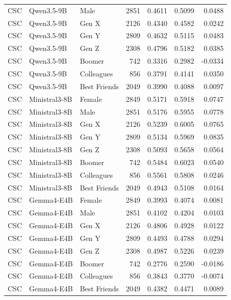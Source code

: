 \begin{longtable}{lllrrrr}
CSC & Qwen3.5-9B & Male & 2851 & 0.4611 & 0.5099 & 0.0488 \\
CSC & Qwen3.5-9B & Gen X & 2126 & 0.4340 & 0.4582 & 0.0242 \\
CSC & Qwen3.5-9B & Gen Y & 2809 & 0.4632 & 0.5115 & 0.0483 \\
CSC & Qwen3.5-9B & Gen Z & 2308 & 0.4796 & 0.5182 & 0.0385 \\
CSC & Qwen3.5-9B & Boomer & 742 & 0.3316 & 0.2982 & -0.0334 \\
CSC & Qwen3.5-9B & Colleagues & 856 & 0.3791 & 0.4141 & 0.0350 \\
CSC & Qwen3.5-9B & Best Friends & 2049 & 0.3990 & 0.4088 & 0.0097 \\
CSC & Ministral3-8B & Female & 2849 & 0.5171 & 0.5918 & 0.0747 \\
CSC & Ministral3-8B & Male & 2851 & 0.5176 & 0.5955 & 0.0778 \\
CSC & Ministral3-8B & Gen X & 2126 & 0.5239 & 0.6005 & 0.0765 \\
CSC & Ministral3-8B & Gen Y & 2809 & 0.5134 & 0.5969 & 0.0835 \\
CSC & Ministral3-8B & Gen Z & 2308 & 0.5093 & 0.5658 & 0.0564 \\
CSC & Ministral3-8B & Boomer & 742 & 0.5484 & 0.6023 & 0.0540 \\
CSC & Ministral3-8B & Colleagues & 856 & 0.5561 & 0.5808 & 0.0246 \\
CSC & Ministral3-8B & Best Friends & 2049 & 0.4943 & 0.5108 & 0.0164 \\
CSC & Gemma4-E4B & Female & 2849 & 0.3993 & 0.4074 & 0.0081 \\
CSC & Gemma4-E4B & Male & 2851 & 0.4102 & 0.4204 & 0.0103 \\
CSC & Gemma4-E4B & Gen X & 2126 & 0.4806 & 0.4928 & 0.0122 \\
CSC & Gemma4-E4B & Gen Y & 2809 & 0.4493 & 0.4788 & 0.0294 \\
CSC & Gemma4-E4B & Gen Z & 2308 & 0.4987 & 0.5226 & 0.0239 \\
CSC & Gemma4-E4B & Boomer & 742 & 0.2776 & 0.2590 & -0.0186 \\
CSC & Gemma4-E4B & Colleagues & 856 & 0.3843 & 0.3770 & -0.0074 \\
CSC & Gemma4-E4B & Best Friends & 2049 & 0.4382 & 0.4471 & 0.0089 \\
\end{longtable}
